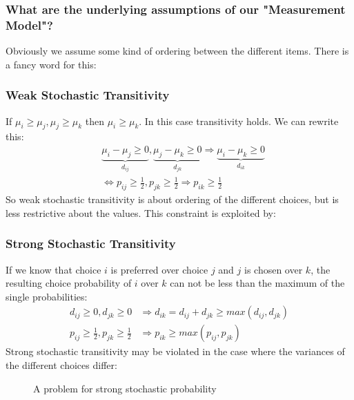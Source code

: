 \documentclass[../main/Notes.tex]{subfiles}
\begin{document}
\subsubsection{What are the underlying assumptions of our "Measurement Model"?}
Obviously we assume some kind of ordering between the different items. There is a fancy word for this:

\subsubsection{Weak Stochastic Transitivity}
If $\mu_i \geq \mu_j,\mu_j \geq \mu_k$ then $\mu_i \geq \mu_k$. In this case transitivity holds. We can rewrite this:
\begin{align*}
&\underbrace{\mu_i-\mu_j \geq 0}_{d_{ij}},\underbrace{\mu_j-\mu_k \geq 0}_{d_{jk}} \Rightarrow \underbrace{\mu_i-\mu_k \geq 0}_{d_{ik}}\\
&\Leftrightarrow p_{ij} \geq \frac{1}{2}, p_{jk} \geq \frac{1}{2} \Rightarrow p_{ik} \geq \frac{1}{2}
\end{align*}
So weak stochastic transitivity is about ordering of the different choices, but is less restrictive about the values. This constraint is exploited by:

\subsubsection{Strong Stochastic Transitivity}
If we know that choice $i$ is preferred over choice $j$ and $j$ is chosen over $k$, the resulting choice probability of $i$ over $k$ can not be less than the maximum of the single probabilities:
\begin{align*}
d_{ij} \geq 0, d_{jk} \geq 0 &\Rightarrow d_{ik} = d_{ij}+d_{jk} \geq max(d_{ij},d_{jk})\\
p_{ij} \geq \frac{1}{2}, p_{jk} \geq \frac{1}{2} &\Rightarrow p_{ik} \geq max(p_{ij},p_{jk})
\end{align*}
Strong stochastic transitivity may be violated in the case where the variances of the different choices differ:
\begin{figure}[htb]
  \centering
  \caption{A problem for strong stochastic probability}
  \label{fig:2014-07-07-strongStochTrans}
\end{figure}
\end{document}
